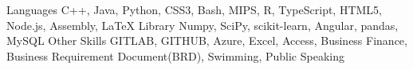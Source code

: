 


\begin{cvskills}
\cvskill
{Languages} %
{C++, Java, Python, CSS3, Bash, MIPS, R, TypeScript, HTML5, Node.js, Assembly,  LaTeX} %
\cvskill
{Library}
{Numpy, SciPy, scikit-learn, Angular, pandas, MySQL}
\cvskill
{Other Skills}
{GITLAB, GITHUB, Azure, Excel, Access, Business Finance, Business Requirement Document(BRD), Swimming, Public Speaking}
\end{cvskills}



